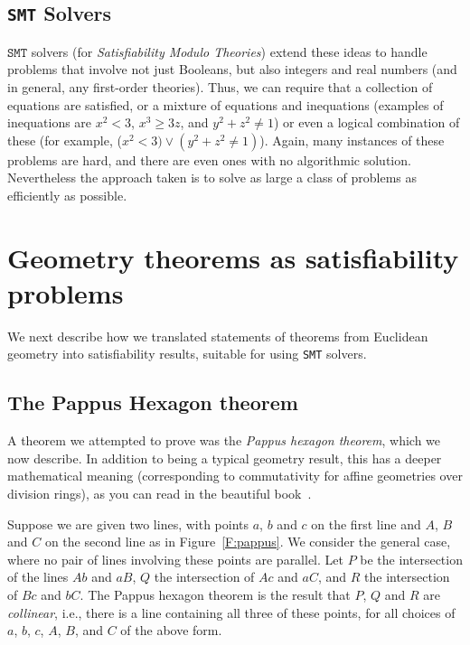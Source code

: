 \documentclass{amsart}
\theoremstyle{plain}
\theoremstyle{definition}
\theoremstyle{remark}
\begin{document}
\subsection{\texttt{SMT} Solvers}
\(\texttt{SMT}\) solvers (for \emph{Satisfiability Modulo Theories}) extend these
ideas to handle problems that involve not just Booleans, but also
integers and real numbers (and in general, any first-order theories). Thus, we can require that a collection of
equations are satisfied, or a mixture of equations and inequations
(examples of inequations are \(x^2 < 3\), \(x^3 \geq 3z\), and
\(y^2 + z^2 \neq 1\)) or even a logical combination of these (for example,
(\(x^2 < 3)\vee(y^2 + z^2 \neq 1)\)). Again, many instances of these problems are hard, and there
are even ones with no algorithmic solution. Nevertheless the approach
taken is to solve as large a class of problems as efficiently as
possible.


\section{Geometry theorems as satisfiability problems}

We next describe how we translated statements of theorems from
Euclidean geometry into satisfiability results, suitable for using \texttt{SMT} solvers.

\subsection{The Pappus Hexagon theorem}
A theorem we attempted to prove was the \emph{Pappus hexagon theorem}, which
we now describe. In addition to being a typical geometry result, this
has a deeper mathematical meaning (corresponding to commutativity for
affine geometries over division rings), as you can read in the beautiful book~\cite{Ar}.

Suppose we are given two lines, with points \(a\), \(b\) and \(c\) on
the first line and \(A\), \(B\) and \(C\) on the second line as in
Figure~\ref{F:pappus}. We consider the general case, where no pair of lines
involving these points are parallel. Let \(P\) be the intersection of
the lines \(Ab\) and \(aB\), \(Q\) the intersection of \(Ac\) and
\(aC\), and \(R\) the intersection of \(Bc\) and \(bC\). The Pappus
hexagon theorem is the result that \(P\), \(Q\) and \(R\) are
\emph{collinear}, i.e., there is a line containing all three of these
points, for all choices of \(a\), \(b\), \(c\), \(A\), \(B\), and \(C\)
of the above form.
\end{document}
